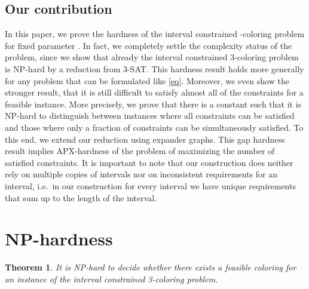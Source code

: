 \documentclass[a4paper,11pt]{article}
\theoremstyle{theorem}
\newtheorem{theorem}{Theorem}
\begin{document}
\subsection{Our contribution}

In this paper, we prove the hardness of the interval constrained -coloring problem for fixed parameter . In fact, we completely settle the complexity status of the problem, since 
we show that already the interval constrained 3-coloring problem is NP-hard by a reduction from 3-SAT. This hardness result holds more generally for any problem that can be formulated like \eqref{eq}.
Moreover, we even show the stronger result, that it is still difficult to satisfy almost all of the constraints for a feasible instance. More precisely, we prove that there is a constant  such that it is NP-hard to distinguish between instances where all constraints can be satisfied and those where only a  fraction of constraints can be simultaneously satisfied. To this end, we extend our reduction using expander graphs. This gap hardness result implies APX-hardness of the problem of maximizing the number of satisfied constraints. It is important to note that our construction does neither rely on multiple copies of intervals nor on inconsistent requirements for an interval, i.e.~in our construction for every interval  we have unique requirements that sum up to the length of the interval.


\section{NP-hardness}

\begin{theorem}
It is NP-hard to decide whether there exists a feasible coloring  for an instance  of the interval constrained 3-coloring problem.
\end{theorem}
\end{document}
